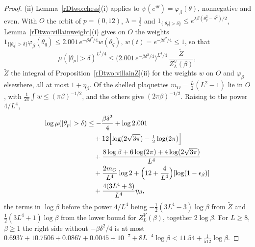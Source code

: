 \begin{proof}
(ii) Lemma~\ref{rDtwo:chess}(i) applies to $\psi(e^{i\theta})=\varphi_\beta(
\theta)$, nonnegative and even. With $O$ the orbit of $p=(0,12)$, $\lambda=
\frac12$ and $1_{\{\lvert\theta_q\rvert>\delta\}}\le e^{\lambda\beta(\theta_q^2
-\delta^2)/2}$, Lemma~\ref{rDtwo:villainweight}(i) gives on $O$ the weights
$1_{\{\lvert\theta_q\rvert>\delta\}}\varphi_\beta(\theta_q)\le2.001\,e^{-\beta
\delta^2/4}w(\theta_q)$, $w(t)=e^{-\beta t^2/4}\le1$, so that
\[
\mu(\lvert\theta_p\rvert>\delta)^{L^4/4}\le\bigl(2.001\,e^{-\beta\delta^2/4}
\bigr)^{L^4/4}\,\frac{\tilde Z}{Z^V_L(\beta)},
\]
$\tilde Z$ the integral of Proposition~\ref{rDtwo:villainZ}(ii) for the
weights $w$ on $O$ and $\varphi_\beta$ elsewhere, all at most $1+\eta_\beta$.
Of the shelled plaquettes $m_O=\frac L2(L^2-1)$ lie in $O$, with $\frac1{2
\pi}\int w\le(\pi\beta)^{-1/2}$, and the others give $(2\pi\beta)^{-1/2}$.
Raising to the power $4/L^4$,
\[
\begin{split}
\log\mu(\lvert\theta_p\rvert>\delta)&\le-\frac{\beta\delta^2}4+\log2.001\\
&\quad+12\Bigl[\log(2\sqrt{3\pi})-\tfrac12\log(2\pi)\Bigr]\\
&\quad+\frac{8\log\beta+6\log(2\pi)+4\log(2\sqrt{3\pi})}{L^4}\\
&\quad+\frac{2m_O}{L^4}\log2+\Bigl(12+\frac4{L^4}\Bigr)\lvert\log(1-\epsilon_\beta)\rvert\\
&\quad+\frac{4(3L^4+3)}{L^4}\eta_\beta,
\end{split}
\]
the terms in $\log\beta$ before the power $4/L^4$ being
$-\frac12(3L^4-3)\log\beta$ from $\tilde Z$ and $\frac12(3L^4+1)\log\beta$
from the lower bound for $Z^V_L(\beta)$, together $2\log\beta$. For $L\ge8$, $\beta\ge1$ the right
side without $-\beta\delta^2/4$ is at most $0.6937+10.7506+0.0867+0.0045+
10^{-7}+8L^{-4}\log\beta<11.54+\frac1{512}\log\beta$.
\end{proof}

